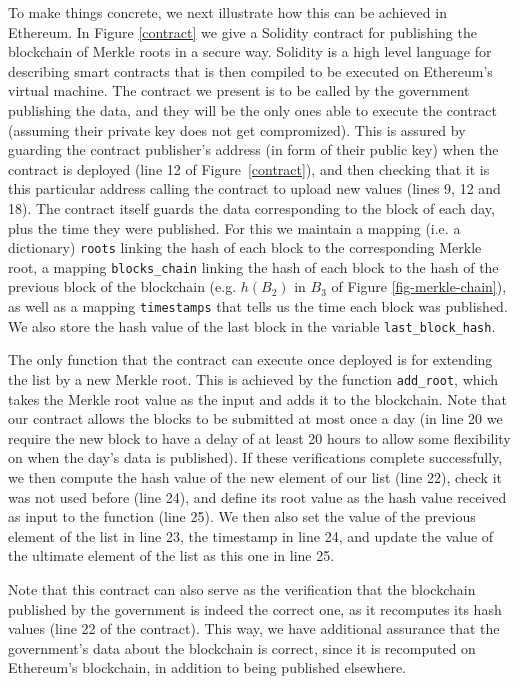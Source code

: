 To make things concrete, we next illustrate how this can be achieved in Ethereum. In Figure \ref{contract} we give a Solidity contract for publishing the blockchain of Merkle roots in a secure way. Solidity \cite{Solidity} is a high level language for describing smart contracts that is then compiled to be executed on Ethereum's virtual machine. The contract we present is to be called by the government publishing the data, and they will be the only ones able to execute the contract (assuming their private key does not get compromized). This is assured by guarding the contract publisher's address (in form of their public key) when the contract is deployed (line 12 of Figure~\ref{contract}), and then checking that it is this particular address calling the contract to upload new values (lines 9, 12 and 18). The contract itself guards the data corresponding to the block of each day, plus the time they were published. For this we maintain a mapping (i.e. a dictionary) \texttt{roots} linking the hash of each block to the corresponding Merkle root, a mapping \texttt{blocks\_chain} linking the hash of each block to the hash of the previous block of the blockchain (e.g. $h(B_2)$ in $B_3$ of Figure \ref{fig-merkle-chain}), as well as a mapping \texttt{timestamps} that tells us the time each block was published. We also store the hash value of the last block in the variable \texttt{last\_block\_hash}.

The only function that the contract can execute once deployed is for extending the list by a new Merkle root. This is achieved by the function \texttt{add\_root}, which takes the Merkle root value as the input and adds it to the blockchain. Note that our contract allows the blocks to be submitted at most once a day (in line 20 we require the new block to have a delay of at least 20 hours to allow some flexibility on when the day's data is published). If these verifications complete successfully, we then compute the hash value of the new element of our list (line 22), check it was not used before (line 24), and define its root value as the hash value received as input to the function (line 25). We then also set the value of the previous element of the list in line 23, the timestamp in line 24, and update the value of the ultimate element of the list as this one in line 25.

Note that this contract can also serve as the verification that the blockchain published by the government is indeed the correct one, as it recomputes its hash values (line 22 of the contract). This way, we have additional assurance that the government's data about the blockchain is correct, since it is recomputed on Ethereum's blockchain, in addition to being published elsewhere.

